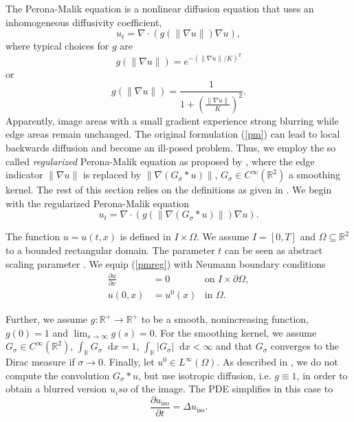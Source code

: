 \documentclass{report}
\renewcommand*\d{\mathop{}\!\mathrm{d}}
\def\ssq{\subseteq}
\def\R{\mathbb{R}}
\def\iso{\text{iso}}
\begin{document}
The Perona-Malik equation \citep{perona1990} is a nonlinear diffusion equation that uses an inhomogeneous diffusivity coefficient,
\begin{equation} \label{pm}
	u_t = \nabla \cdot \left( g(\|\nabla u\|) \nabla u \right),
\end{equation}
where typical choices for $g$ are
\begin{equation}
	g(\|\nabla u\|) = e^{-(\|\nabla u\|/K)^2}
\end{equation}
or
\begin{equation}
	g(\|\nabla u\|) = \frac{1}{1 + \left( \frac{\|\nabla u\|}{K}\right)^2}.
\end{equation}
Apparently, image areas with a small gradient experience strong blurring while edge areas remain unchanged. The original formulation (\ref{pm}) can lead to local backwards diffusion and become an ill-posed problem. Thus, we employ the so called \emph{regularized} Perona-Malik equation as proposed by \cite{catte1992}, where the edge indicator $\|\nabla u\|$ is replaced by $\|\nabla (G_\sigma \ast u)\|$, $G_\sigma \in C^\infty(\R^2)$ a smoothing kernel. The rest of this section relies on the definitions as given in \cite{handlovicova2002}. We begin with the regularized Perona-Malik equation
\begin{equation} \label{pmreg}
    u_t = \nabla \cdot \left( g\left(\left\|\nabla (G_{\sigma} \ast u)\right\|\right) \nabla u \right).
\end{equation}

The function $u = u(t,x)$ is defined in $I \times \Omega$. We assume $I = [0, T]$ and $\Omega \ssq \R^2$ to a bounded rectangular domain. The parameter $t$ can be seen as abstract scaling parameter \citep[p. 219]{handlovicova2002}. We equip (\ref{pmreg}) with Neumann boundary conditions
\begin{align}
	\frac{\partial u}{\partial \nu} &= 0 & \text{on } I \times \partial \Omega, \\
	u(0,x) &= {u^0}(x) & \text{in } \Omega.
\end{align}

Further, we assume $g: \R^+ \rightarrow \R^+$ to be a smooth, nonincreasing function, $g(0)=1$ and $\lim_{s \rightarrow \infty} g(s) = 0$. For the smoothing kernel, we assume $G_\sigma \in C^\infty(\R^2)$, $\int_\R G_\sigma \d x = 1$, $\int_\R |G_\sigma| \d x < \infty$ and that $G_\sigma$ converges to the Dirac measure if $\sigma \to 0$. Finally, let $u^0 \in L^\infty(\Omega)$. As described in \cite{handlovicova2002}, we do not compute the convolution $G_{\sigma} \ast u$, but use isotropic diffusion, i.e. $g \equiv 1$, in order to obtain a blurred version $u_iso$ of the image. The PDE simplifies in this case to
\begin{equation} \label{pmiso}
	\frac{\partial u_\iso}{\partial t} = \Delta u_\iso.
\end{equation}
\end{document}
